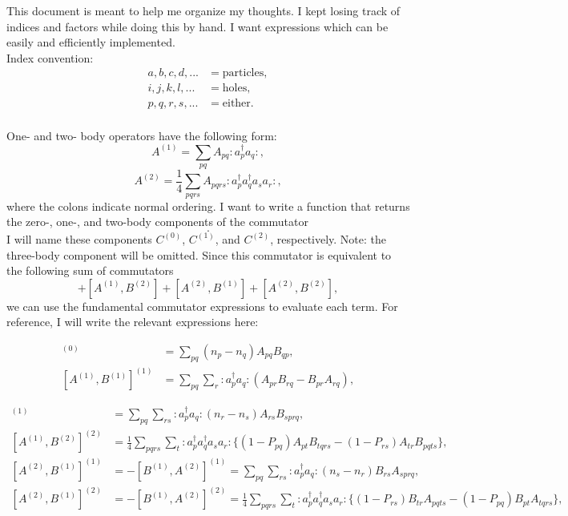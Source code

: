 \documentclass[12pt]{article}
\begin{document}
\noindent This document is meant to help me organize my thoughts. I kept losing track of indices and factors while doing this by hand. I want expressions which can be easily and efficiently implemented.\\

\noindent Index convention:
\begin{equation*}
\begin{split}
a,b,c,d,... &= \text{particles},\\
i,j,k,l,... &= \text{holes},\\
p,q,r,s,... &= \text{either}.\\
\end{split}
\end{equation*}


\noindent One- and two- body operators have the following form:
\begin{equation}
A^{(1)} = \sum_{pq} A_{pq} :a_p^\dagger a_q:,
\end{equation}
\begin{equation}
A^{(2)} = \frac{1}{4} \sum_{pqrs} A_{pqrs} :a_p^\dagger a_q^\dagger a_s a_r:,
\end{equation}
\noindent where the colons indicate normal ordering. I want to write a function that returns the zero-, one-, and two-body components of the commutator
\begin{equation}
[A^{(1)}+A^{(2)},B^{(1)}+B^{(2)}].
\end{equation}
I will name these components $C^{(0)}$, $C^{(1)}$, and $C^{(2)}$, respectively. Note: the three-body component will be omitted. Since this commutator is equivalent to the following sum of commutators
\begin{equation}
[A^{(1)},B^{(1)}]+[A^{(1)},B^{(2)}]+[A^{(2)},B^{(1)}]+[A^{(2)},B^{(2)}],
\end{equation}
we can use the fundamental commutator expressions to evaluate each term. For reference, I will write the relevant expressions here:

\begin{align}
[A^{(1)},B^{(1)}]^{(0)} &= \sum_{pq}(n_p-n_q)A_{pq}B_{qp},\\
[A^{(1)},B^{(1)}]^{(1)} &= \sum_{pq}\sum_{r} :a_p^\dagger a_q:(A_{pr}B_{rq}-B_{pr}A_{rq}),
\end{align}

\begin{align}
[A^{(1)},B^{(2)}]^{(1)} &= \sum_{pq}\sum_{rs} :a_p^\dagger a_q: (n_r-n_s) A_{rs}B_{sprq},\\
[A^{(1)},B^{(2)}]^{(2)} &= \frac{1}{4} \sum_{pqrs}\sum_t :a_p^\dagger a_q^\dagger a_s a_r : \{ (1-P_{pq})A_{pt}B_{tqrs} -(1-P_{rs})A_{tr}B_{pqts}\},\\
[A^{(2)},B^{(1)}]^{(1)} &= -[B^{(1)},A^{(2)}]^{(1)} = \sum_{pq}\sum_{rs} :a_p^\dagger a_q: (n_s-n_r) B_{rs}A_{sprq},\\
[A^{(2)},B^{(1)}]^{(2)} &= -[B^{(1)},A^{(2)}]^{(2)} = \frac{1}{4} \sum_{pqrs}\sum_t :a_p^\dagger a_q^\dagger a_s a_r : \{(1-P_{rs})B_{tr}A_{pqts} -  (1-P_{pq})B_{pt}A_{tqrs}\},
\end{align}
\end{document}
